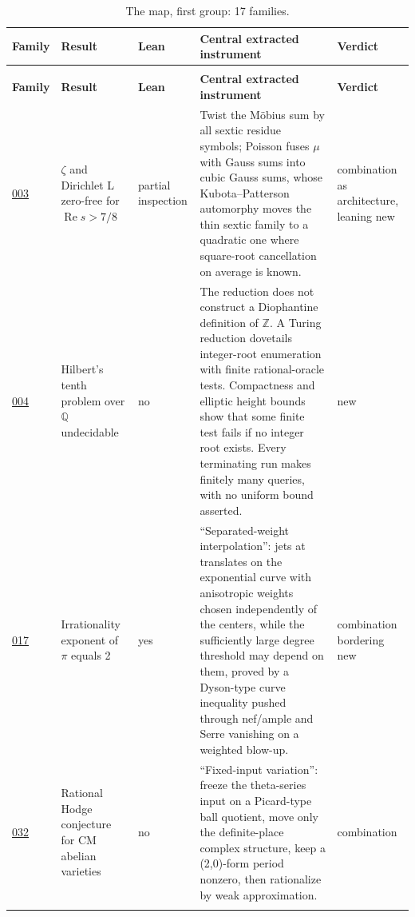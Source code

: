 \documentclass[11pt]{article}
\begin{document}
{\footnotesize\setlength{\tabcolsep}{3pt}
\begin{longtable}{@{}>{\raggedright\arraybackslash}p{}>{\raggedright\arraybackslash}p{}>{\raggedright\arraybackslash}p{}>{\raggedright\arraybackslash}p{}>{\raggedright\arraybackslash}p{}@{}}
\caption{The map, first group: 17 families.}\label{tab:map1}\\
\toprule
\textbf{Family} & \textbf{Result} & \textbf{Lean} & \textbf{Central extracted instrument} & \textbf{Verdict} \\
\midrule
\endfirsthead
\multicolumn{5}{@{}l}{\emph{(continued)}}\\
\toprule
\textbf{Family} & \textbf{Result} & \textbf{Lean} & \textbf{Central extracted instrument} & \textbf{Verdict} \\
\midrule
\endhead
\bottomrule
\endfoot
\hyperref[fam:003]{003} & $\zeta$ and Dirichlet L zero-free for $\operatorname{Re} s>7/8$ & partial inspection & Twist the Möbius sum by all sextic residue symbols; Poisson fuses $\mu$ with Gauss sums into cubic Gauss sums, whose Kubota--Patterson automorphy moves the thin sextic family to a quadratic one where square-root cancellation on average is known. & combination as architecture, leaning new \\ \addlinespace
\hyperref[fam:004]{004} & Hilbert's tenth problem over $\mathbb{Q}$ undecidable & no & The reduction does not construct a Diophantine definition of $\mathbb{Z}$. A Turing reduction dovetails integer-root enumeration with finite rational-oracle tests. Compactness and elliptic height bounds show that some finite test fails if no integer root exists. Every terminating run makes finitely many queries, with no uniform bound asserted. & new \\ \addlinespace
\hyperref[fam:017]{017} & Irrationality exponent of $\pi$ equals 2 & yes & ``Separated-weight interpolation'': jets at translates on the exponential curve with anisotropic weights chosen independently of the centers, while the sufficiently large degree threshold may depend on them, proved by a Dyson-type curve inequality pushed through nef/ample and Serre vanishing on a weighted blow-up. & combination bordering new \\ \addlinespace
\hyperref[fam:032]{032} & Rational Hodge conjecture for CM abelian varieties & no & ``Fixed-input variation'': freeze the theta-series input on a Picard-type ball quotient, move only the definite-place complex structure, keep a (2,0)-form period nonzero, then rationalize by weak approximation. & combination \\ \addlinespace

\end{longtable}}
\end{document}
